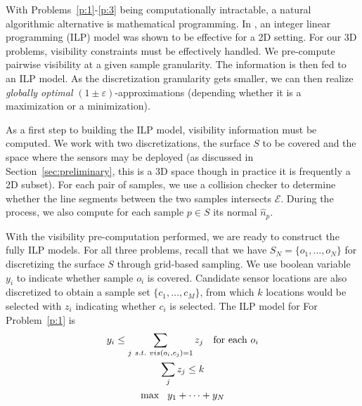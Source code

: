With Problems~\ref{p:1}-\ref{p:3} being computationally intractable, a natural algorithmic alternative is mathematical programming. In \cite{fengyu2020optimally}, an integer linear programming (ILP) model was shown to be effective for a 2D setting. For our 3D problems, visibility constraints must be effectively handled. We pre-compute pairwise visibility at a given sample granularity. The information is then fed to an ILP model. As the discretization granularity gets smaller, we can then realize \emph{globally optimal} $(1\pm \varepsilon)$-approximations (depending whether it is a maximization or a minimization). 

As a first step to building the ILP model, visibility information must be computed. 
We work with two discretizations, the surface $S$ to be covered and the space where the sensors may be deployed (as discussed in Section~\ref{sec:preliminary}, this is a 3D space though in practice it is frequently a 2D subset). For each pair of samples, we use a collision checker \cite{cgal:aabb-20b} to determine whether the line segments between the two samples intersects $\mathcal E$. During the process, we also compute for each sample $p\in S$ its normal $\hat{n}_p$.


%
With the visibility pre-computation performed, we are ready to construct the fully ILP models. For all three problems, recall that we have $S_N = \{o_1, \ldots, o_N\}$ for discretizing the surface $S$ through grid-based sampling. 
We use boolean variable $y_i$ to indicate whether sample $o_i$ is covered. 
Candidate sensor locations are also discretized to obtain a sample set $\{c_1, \ldots, c_M\}$, from which $k$ locations would be selected with $z_i$ indicating whether $c_i$ is selected. The ILP model for For Problem~\ref{p:1} is
\begin{gather}
    y_i   \leq \sum_{j\ s.t.\ vis(o_i, c_j) = 1} z_j   \text{\quad for each } o_i\\
    \sum_j z_j \leq k\\
    \max\ \ y_1 + \dots + y_N
\end{gather}


